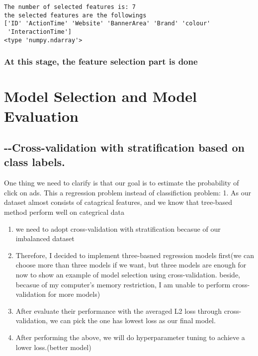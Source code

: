 \documentclass[11pt]{article}
\begin{document}
    \begin{Verbatim}[commandchars=\\\{\}]
The number of selected features is: 7
the selected features are the followings
['ID' 'ActionTime' 'Website' 'BannerArea' 'Brand' 'colour'
 'InteractionTime']
<type 'numpy.ndarray'>

    \end{Verbatim}

    \subsubsection{At this stage, the feature selection part is
done}\label{at-this-stage-the-feature-selection-part-is-done}

\section{Model Selection and Model
Evaluation}\label{model-selection-and-model-evaluation}

\subsection{-\/-Cross-validation with stratification based on class
labels.}\label{cross-validation-with-stratification-based-on-class-labels.}

One thing we need to clarify is that our goal is to estimate the
probability of click on ads. This a regression problem instead of
classifiction problem: 1. As our dataset almost consists of catagrical
features, and we know that tree-based method perform well on categrical
data

\begin{enumerate}
\def\labelenumi{\arabic{enumi}.}
\setcounter{enumi}{1}
\item
  we need to adopt cross-validation with stratification becasue of our
  imbalanced dataset
\item
  Therefore, I decided to implement three-basned regression models
  first(we can choose more than three models if we want, but three
  models are enough for now to show an example of model selection using
  cross-validation. beside, becasue of my computer's memory restriction,
  I am unable to perform cross-validation for more models)
\item
  After evaluate their performance with the averaged L2 loss through
  cross-validation, we can pick the one has lowest loss as our final
  model.
\item
  After performing the above, we will do hyperparameter tuning to
  achieve a lower loss.(better model)
\end{enumerate}
\end{document}
